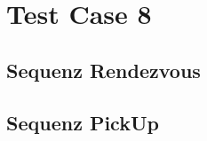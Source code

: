 \clearpage
\section{Test Case 8}\label{sec:anhang_test_case_8}
\subsection{Sequenz Rendezvous}
\begin{center}
  \label{TestCase8Sequence1Picture}
\end{center}


\subsection{Sequenz PickUp}
\begin{center}
  \label{TestCase8Sequence2Picture}
\end{center}



